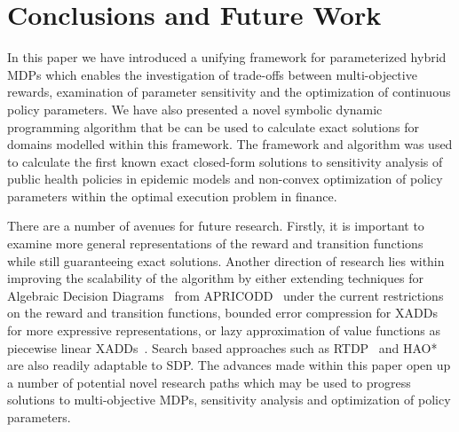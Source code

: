 \section{Conclusions and Future Work}
\label{sec:conclusion}

In this paper we have introduced a unifying framework for parameterized hybrid MDPs which enables the investigation of trade-offs between multi-objective rewards, examination of parameter sensitivity and the optimization of continuous policy parameters. We have also presented a novel symbolic dynamic programming algorithm that be can be used to calculate exact solutions for domains modelled within this framework. The framework and algorithm was used to calculate the first known exact closed-form solutions to sensitivity analysis of public health policies in epidemic models and non-convex optimization of policy parameters within the optimal execution problem in finance.

There are a number of avenues for future research. Firstly, it is important to examine more general representations of the reward and transition functions while still guaranteeing exact solutions. Another direction of research lies within improving the scalability of the algorithm by either extending techniques for Algebraic Decision Diagrams~\parencite{Bahar_JoFMiSD_1993} from APRICODD~\parencite{St-Aubin_NIPS_2000} under the current restrictions on the reward and transition functions, bounded error compression for 
XADDs~\parencite{Vianna_UAI_2013} for more expressive representations, or lazy approximation of value functions as piecewise linear XADDs~\parencite{Li_AAAI_2005}. Search based approaches such as RTDP~\parencite{Barto_AI_1995} and HAO*~\parencite{Meuleau_JoAIR_2009}
are also readily adaptable to SDP. The advances made within this paper open up a number of potential novel research paths which may be used to progress solutions to multi-objective MDPs, sensitivity analysis and optimization of policy parameters.